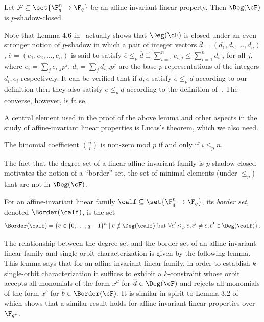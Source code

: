 \begin{lemma}\label{lem:monomial-spread}
%
Let $\mathcal{F} \subseteq \set{\F_{q}^n \to \F_q}$ be an affine-invariant linear property. Then $\Deg(\cF)$ is $p$-shadow-closed.
\end{lemma}

\begin{remark}
Note that Lemma 4.6 in~\cite{KS08-ECCC} actually shows that $\Deg(\cF)$ is closed under an even stronger notion of $p$-shadow in which a pair of integer vectors $ \overline d=(d_1,d_2,\ldots,d_n)$, $\overline e=(e_1,e_2,\ldots,e_n)$ is said to satisfy
$\overline e \leq_p  \overline d$ if $\sum_{i=1}^n e_{i,j} \leq \sum_{i=1}^n d_{i,j}$ for all $j$, where $e_i = \sum_{j} e_{i,j} p^j$,  $d_i = \sum_{j} d_{i,j} p^j$ are the base-$p$ representations
of the integers $d_i, e_i$ respectively. It can be verified that if $\overline d, \overline e$ satisfy $\overline e \leq_p \overline d$ according to our definition then they also satisfy  $\overline e \leq_p \overline d$   according to the definition of~\cite{KS08-ECCC}. The converse, however, is false.
\end{remark}

A central element used in the proof of the above lemma and
other aspects in the study of affine-invariant linear properties is
Lucas's theorem, which we also need.

\begin{theorem}\label{thm:luca}
The %
binomial
coefficient $\binom {n} {i} $ is non-zero mod $p$ if and only if $i \leq_p n$.
\end{theorem}

The fact that the degree set of a linear affine-invariant family is $p$-shadow-closed 
motivates the notion of a ``border'' set, the set of minimal elements (under $\leq_p$) that are not in $\Deg(\cF)$.
\begin{definition}[Border]\label{defn:border}
For an affine-invariant linear family $\calf \subseteq \set{\F_q^n \to \F_q}$, its \emph{border set}, denoted $\Border(\calf)$,
is the set \[\Border(\calf) = \{\overline e \in \{0,\ldots,q-1\}^n \;|\; \overline e \notin \Deg(\calf) \text{~but~}
\forall \overline e' \leq_p \overline e, \overline e'\ne \overline e, \overline e' \in \Deg(\calf)\}\,.\]
\end{definition}

The relationship between the degree set and the border set of an affine-invariant linear family and single-orbit characterization is given by the following lemma.
This lemma  says that for an affine-invariant linear family, in order to establish $k$-single-orbit characterization it suffices to exhibit a $k$-constraint whose orbit accepts
all monomials of the form $x^{\overline d}$ for
 $\overline d \in \Deg(\cF)$ and  rejects all monomials of the form $x^{\overline b}$ for
  $\overline b \in \Border(\cF)$. It is similar in spirit to Lemma 3.2 of~\cite{BGMSS11} which shows that a similar result holds for affine-invariant linear properties over $\F_{q^n}$.

